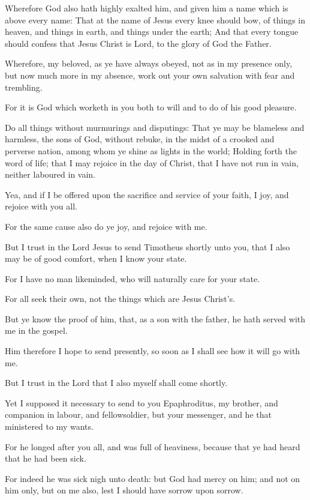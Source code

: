 \verse Wherefore God also hath highly exalted him, and given him a name which is above every name: \verse That at the name of Jesus every knee should bow, of things in heaven, and things in earth, and things under the earth; \verse And that every tongue should confess that Jesus Christ is Lord, to the glory of God the Father.

\verse Wherefore, my beloved, as ye have always obeyed, not as in my presence only, but now much more in my absence, work out your own salvation with fear and trembling.

\verse For it is God which worketh in you both to will and to do of his good pleasure.

\verse Do all things without murmurings and disputings: \verse That ye may be blameless and harmless, the sons of God, without rebuke, in the midst of a crooked and perverse nation, among whom ye shine as lights in the world; \verse Holding forth the word of life; that I may rejoice in the day of Christ, that I have not run in vain, neither laboured in vain.

\verse Yea, and if I be offered upon the sacrifice and service of your faith, I joy, and rejoice with you all.

\verse For the same cause also do ye joy, and rejoice with me.

\verse But I trust in the Lord Jesus to send Timotheus shortly unto you, that I also may be of good comfort, when I know your state.

\verse For I have no man likeminded, who will naturally care for your state.

\verse For all seek their own, not the things which are Jesus Christ's.

\verse But ye know the proof of him, that, as a son with the father, he hath served with me in the gospel.

\verse Him therefore I hope to send presently, so soon as I shall see how it will go with me.

\verse But I trust in the Lord that I also myself shall come shortly.

\verse Yet I supposed it necessary to send to you Epaphroditus, my brother, and companion in labour, and fellowsoldier, but your messenger, and he that ministered to my wants.

\verse For he longed after you all, and was full of heaviness, because that ye had heard that he had been sick.

\verse For indeed he was sick nigh unto death: but God had mercy on him; and not on him only, but on me also, lest I should have sorrow upon sorrow.

